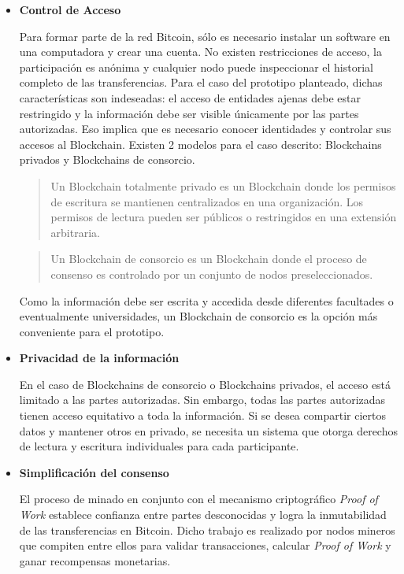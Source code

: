 \begin{itemize}


\item \textbf{Control de Acceso} \newline

Para formar parte de la red Bitcoin, sólo es necesario instalar un software en una computadora y crear una cuenta. No existen restricciones de acceso, la participación es anónima y cualquier nodo puede inspeccionar el historial completo de las transferencias. 
Para el caso del prototipo planteado, dichas características son indeseadas: el acceso de entidades ajenas debe estar restringido y la información debe ser visible únicamente por las partes autorizadas. Eso implica que es necesario conocer identidades y controlar sus accesos al Blockchain. 
Existen 2 modelos para el caso descrito: Blockchains privados y Blockchains de consorcio.

\begin{quote}Un Blockchain totalmente privado es un Blockchain donde los permisos de escritura se mantienen centralizados en una organización. Los permisos de lectura pueden ser públicos o restringidos en una extensión arbitraria.\cite{bc_privado}
\end{quote}

\begin{quote}
    Un Blockchain de consorcio es un Blockchain donde el proceso de consenso es controlado por un conjunto de nodos preseleccionados.\cite{bc_privado}
\end{quote}

Como la información debe ser escrita y accedida desde diferentes facultades o eventualmente universidades, un Blockchain de consorcio es la opción más conveniente para el prototipo.

\item \textbf{Privacidad de la información}

En el caso de Blockchains de consorcio o Blockchains privados, el acceso está limitado a las partes autorizadas. Sin embargo, todas las partes autorizadas tienen acceso equitativo a toda la información. Si se desea compartir ciertos datos y mantener otros en privado, se necesita un sistema que otorga derechos de lectura y escritura individuales para cada participante.

\item \textbf{Simplificación del consenso}

El proceso de minado en conjunto con el mecanismo criptográfico \textit{Proof of Work} establece confianza entre partes desconocidas y logra la inmutabilidad de las transferencias en Bitcoin. Dicho trabajo es realizado por nodos mineros que compiten entre ellos para validar transacciones, calcular \textit{Proof of Work} y ganar recompensas monetarias.


\end{itemize}
